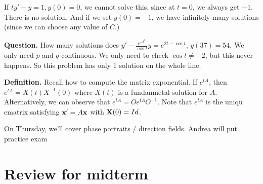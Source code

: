 \documentclass{article}
\begin{document}
If $ty' - y = 1, y(0) = 0$, we cannot solve this, since at $t = 0$, we always get $-1$.  There is no solution.  And if we set $y(0) = -1$, we have infinitely many solutions (since we can choose any value of $C$.)

{\bf Question.} How many solutions does $y' - \frac{e^{-t^2}}{\cos t} y = e^{2t - \cos t}$, $y(37) = 54$.  We only need $p$ and $q$ continuous.  We only need to check $\cos t \neq -2$, but this never happens.  So this problem has only 1 solution on the whole line.

{\bf Definition.} Recall how to compute the matrix exponential.  If $e^{tA}$, then $e^{tA} = X(t) X^{-1}(0)$ where $X(t)$ is a fundamnetal solution for $A$.  Alternatively, we can observe that $e^{tA} = O e^{t \Lambda} O^{-1}$.  Note that $e^{tA}$ is the uniqu ematrix satisfying $\mathbf{x}' = A \mathbf{x}$ with $\mathbf{X}(0) = Id$.

On Thursday, we'll cover phase portraits / direction fields.  Andrea will put practice exam

\section{Review for midterm}
\end{document}
